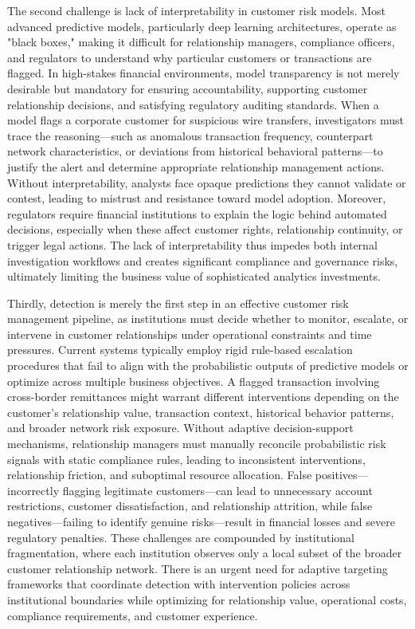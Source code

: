 \documentclass[11pt,english]{article}
\begin{document}
The second challenge is lack of interpretability in customer risk models. Most advanced predictive models, particularly deep learning architectures, operate as "black boxes," making it difficult for relationship managers, compliance officers, and regulators to understand why particular customers or transactions are flagged. In high-stakes financial environments, model transparency is not merely desirable but mandatory for ensuring accountability, supporting customer relationship decisions, and satisfying regulatory auditing standards. When a model flags a corporate customer for suspicious wire transfers, investigators must trace the reasoning—such as anomalous transaction frequency, counterpart network characteristics, or deviations from historical behavioral patterns—to justify the alert and determine appropriate relationship management actions. Without interpretability, analysts face opaque predictions they cannot validate or contest, leading to mistrust and resistance toward model adoption. Moreover, regulators require financial institutions to explain the logic behind automated decisions, especially when these affect customer rights, relationship continuity, or trigger legal actions. The lack of interpretability thus impedes both internal investigation workflows and creates significant compliance and governance risks, ultimately limiting the business value of sophisticated analytics investments. 

Thirdly, detection is merely the first step in an effective customer risk management pipeline, as institutions must decide whether to monitor, escalate, or intervene in customer relationships under operational constraints and time pressures. Current systems typically employ rigid rule-based escalation procedures that fail to align with the probabilistic outputs of predictive models or optimize across multiple business objectives. A flagged transaction involving cross-border remittances might warrant different interventions depending on the customer's relationship value, transaction context, historical behavior patterns, and broader network risk exposure. Without adaptive decision-support mechanisms, relationship managers must manually reconcile probabilistic risk signals with static compliance rules, leading to inconsistent interventions, relationship friction, and suboptimal resource allocation. False positives—incorrectly flagging legitimate customers—can lead to unnecessary account restrictions, customer dissatisfaction, and relationship attrition, while false negatives—failing to identify genuine risks—result in financial losses and severe regulatory penalties. These challenges are compounded by institutional fragmentation, where each institution observes only a local subset of the broader customer relationship network. There is an urgent need for adaptive targeting frameworks that coordinate detection with intervention policies across institutional boundaries while optimizing for relationship value, operational costs, compliance requirements, and customer experience.
\end{document}
